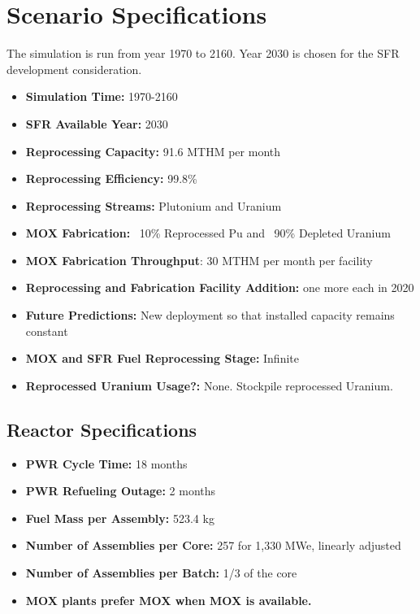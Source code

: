 \section{Scenario Specifications}

The simulation is run from year 1970 to 2160. Year 2030 is chosen for the 
SFR development consideration.

\begin{itemize}
	\item \textbf{Simulation Time:}  1970-2160 
	\item \textbf{\gls{SFR} Available Year:}  2030  
	\item \textbf{Reprocessing Capacity:}  91.6 MTHM per month \cite{schneider_spent_2008}  
	\item \textbf{Reprocessing Efficiency:}  99.8\%  
	\item \textbf{Reprocessing Streams:}  Plutonium and Uranium  
	\item \textbf{\gls{MOX} Fabrication:}  ~10\% Reprocessed Pu and ~90\% Depleted Uranium  
	\item \textbf{\gls{MOX} Fabrication Throughput}: 30 MTHM per month per facility \cite{hugelmann_melox_1999} 
	\item \textbf{Reprocessing and Fabrication Facility Addition:}  one more each in 2020  
	\item \textbf{Future Predictions:} New deployment so that installed capacity remains constant  
	\item \textbf{\gls{MOX} and \gls{SFR} Fuel Reprocessing Stage:}  Infinite  
	\item\textbf{Reprocessed Uranium Usage?:}  None. Stockpile reprocessed Uranium. \\
\end{itemize}

\subsection{Reactor Specifications}

\begin{itemize}
	\item \textbf{PWR Cycle Time:} 18 months  
	\item \textbf{PWR Refueling Outage:} 2 months  
	\item \textbf{Fuel Mass per Assembly:} 523.4 kg  
	\item \textbf{Number of Assemblies per Core:} 257 for 1,330 MWe, linearly adjusted  
	\item \textbf{Number of Assemblies per Batch:} 1/3 of the core  
	\item \textbf{\gls{MOX} plants prefer \gls{MOX} when \gls{MOX} is available.}
\end{itemize}
